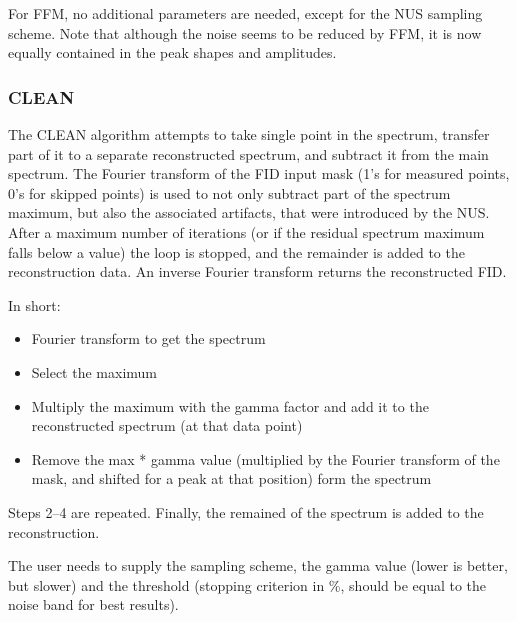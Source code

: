\documentclass[11pt,a4paper]{article}
\begin{document}
For FFM, no additional parameters are needed, except for the NUS sampling scheme. Note that although the noise seems to be reduced by FFM, it is now equally contained
in the peak shapes and amplitudes.




\subsubsection{CLEAN}
The CLEAN algorithm attempts to take single point in the spectrum, transfer part of it to a separate reconstructed spectrum, and subtract it from the main spectrum.
The Fourier transform of the FID input mask (1's for measured points, 0's for skipped points) is used to not only subtract part of the spectrum maximum, but also the
associated artifacts, that were introduced by the NUS. After a maximum number of iterations (or if the residual spectrum maximum falls below a value) the 
loop is stopped, and the remainder is added to the reconstruction data. An inverse Fourier transform returns the reconstructed FID.

In short:
\begin{itemize}
  \item Fourier transform to get the spectrum
	 \item Select the maximum
	 \item Multiply the maximum with the gamma factor and add it to the reconstructed spectrum (at that data point) 
	 \item Remove the max * gamma value (multiplied by the Fourier transform of the mask, and shifted for a peak at that position) form the spectrum 
\end{itemize}
Steps 2--4 are repeated. Finally, the remained of the spectrum is added to the reconstruction.

The user needs to supply the sampling scheme, the gamma value (lower is better, but slower) and the threshold (stopping criterion in \%, should be equal to the noise band for best results).
\end{document}
